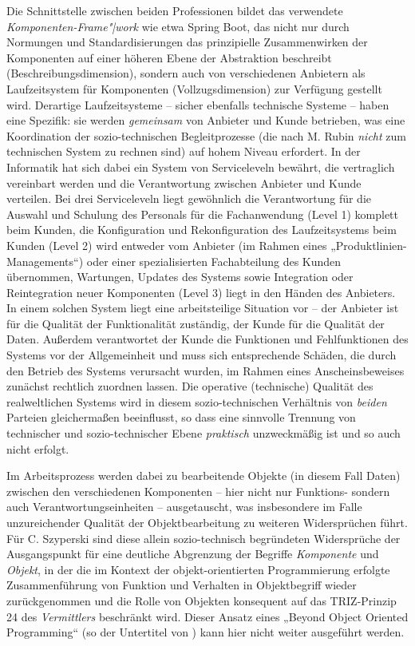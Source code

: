 \documentclass[11pt,a4paper]{article}
\begin{document}
Die Schnittstelle zwischen beiden Professionen bildet das verwendete
\emph{Komponenten-Frame"|work} wie etwa Spring Boot, das nicht nur durch
Normungen und Standardisierungen das prinzipielle Zusammenwirken der
Komponenten auf einer höheren Ebene der Abstraktion beschreibt
(Beschreibungsdimension), sondern auch von verschiedenen Anbietern als
Laufzeitsystem für Komponenten (Vollzugsdimension) zur Verfügung gestellt
wird. Derartige Laufzeitsysteme -- sicher ebenfalls technische Systeme --
haben eine Spezifik: sie werden \emph{gemeinsam} von Anbieter und Kunde
betrieben, was eine Koordination der sozio-technischen Begleitprozesse (die
nach M. Rubin \emph{nicht} zum technischen System zu rechnen sind) auf hohem
Niveau erfordert. In der Informatik hat sich dabei ein System von
Serviceleveln bewährt, die vertraglich vereinbart werden und die Verantwortung
zwischen Anbieter und Kunde verteilen. Bei drei Serviceleveln liegt gewöhnlich
die Verantwortung für die Auswahl und Schulung des Personals für die
Fachanwendung (Level 1) komplett beim Kunden, die Konfiguration und
Rekonfiguration des Laufzeitsystems beim Kunden (Level 2) wird entweder vom
Anbieter (im Rahmen eines „Produktlinien-Managements“) oder einer
spezialisierten Fachabteilung des Kunden übernommen, Wartungen, Updates des
Systems sowie Integration oder Reintegration neuer Komponenten (Level 3) liegt
in den Händen des Anbieters. In einem solchen System liegt eine arbeitsteilige
Situation vor -- der Anbieter ist für die Qualität der Funktionalität
zuständig, der Kunde für die Qualität der Daten. Außerdem verantwortet der
Kunde die Funktionen und Fehlfunktionen des Systems vor der Allgemeinheit und
muss sich entsprechende Schäden, die durch den Betrieb des Systems verursacht
wurden, im Rahmen eines Anscheinsbeweises zunächst rechtlich zuordnen lassen.
Die operative (technische) Qualität des realweltlichen Systems wird in diesem
sozio-technischen Verhältnis von \emph{beiden} Parteien gleichermaßen
beeinflusst, so dass eine sinnvolle Trennung von technischer und
sozio-technischer Ebene \emph{praktisch} unzweckmäßig ist und so auch nicht
erfolgt.

Im Arbeitsprozess werden dabei zu bearbeitende Objekte (in diesem Fall Daten)
zwischen den verschiedenen Komponenten -- hier nicht nur Funktions- sondern
auch Verantwortungseinheiten -- ausgetauscht, was insbesondere im Falle
unzureichender Qualität der Objektbearbeitung zu weiteren Widersprüchen führt.
Für C. Szyperski \cite{Szyperski2002} sind diese allein sozio-technisch
begründeten Widersprüche der Ausgangspunkt für eine deutliche Abgrenzung der
Begriffe \emph{Komponente} und \emph{Objekt}, in der die im Kontext der
objekt-orientierten Programmierung erfolgte Zusammenführung von Funktion und
Verhalten in Objektbegriff wieder zurückgenommen und die Rolle von Objekten
konsequent auf das TRIZ-Prinzip 24 des \emph{Vermittlers} beschränkt wird.
Dieser Ansatz eines „Beyond Object Oriented Programming“ (so der Untertitel
von \cite{Szyperski2002}) kann hier nicht weiter ausgeführt werden.
\end{document}
